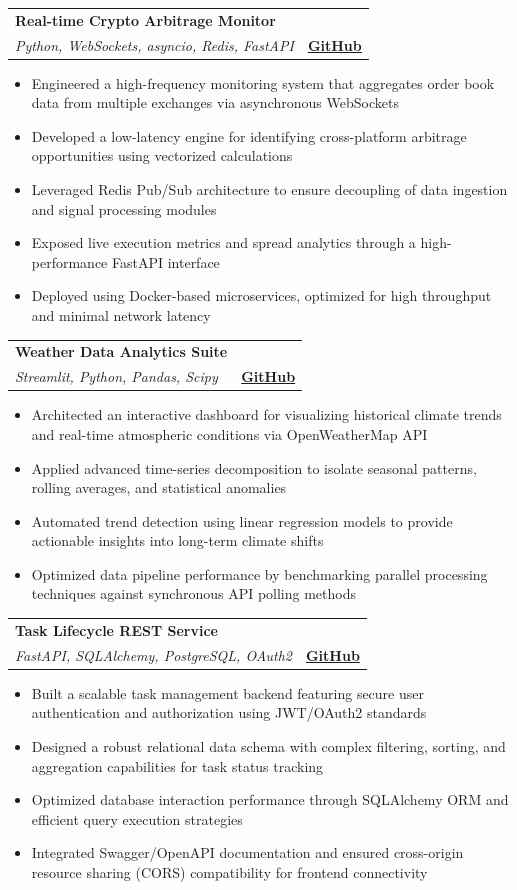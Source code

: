 \documentclass[a4paper,11pt]{article}
\makeatletter
\newcommand{\resumeProject}[4]{
\vspace{0.5mm}\item
    \begin{tabular*}{0.98\textwidth}[t]{l@{\extracolsep{\fill}}r}
        \textbf{#1} & \textit{\footnotesize{#3}} \\
        \footnotesize{\textit{#2}} & \footnotesize{#4}
    \end{tabular*}
    \vspace{-2.4mm}
}
\newcommand{\resumeItemListStart}{\begin{justify}\begin{itemize}[leftmargin=3ex, rightmargin=2ex, noitemsep,labelsep=1.2mm,itemsep=0mm]\small}
\newcommand{\resumeItemListEnd}{\end{itemize}\end{justify}\vspace{-2mm}}
\makeatother
\begin{document}
    \resumeProject
      {Real-time Crypto Arbitrage Monitor} %
      {Python, WebSockets, asyncio, Redis, FastAPI} %
      {} %
      {\href{https://github.com}{\textbf{GitHub}}} %
      \resumeItemListStart
        \item {Engineered a high-frequency monitoring system that aggregates order book data from multiple exchanges via asynchronous WebSockets}
        \item {Developed a low-latency engine for identifying cross-platform arbitrage opportunities using vectorized calculations}
        \item {Leveraged Redis Pub/Sub architecture to ensure decoupling of data ingestion and signal processing modules}
        \item {Exposed live execution metrics and spread analytics through a high-performance FastAPI interface}
        \item {Deployed using Docker-based microservices, optimized for high throughput and minimal network latency}
      \resumeItemListEnd
    
    \resumeProject
      {Weather Data Analytics Suite} %
      {Streamlit, Python, Pandas, Scipy} %
      {} %
      {\href{https://github.com}{\textbf{GitHub}}} %
      \resumeItemListStart
        \item {Architected an interactive dashboard for visualizing historical climate trends and real-time atmospheric conditions via OpenWeatherMap API}
        \item {Applied advanced time-series decomposition to isolate seasonal patterns, rolling averages, and statistical anomalies}
        \item {Automated trend detection using linear regression models to provide actionable insights into long-term climate shifts}
        \item {Optimized data pipeline performance by benchmarking parallel processing techniques against synchronous API polling methods}
      \resumeItemListEnd
    
     \vspace{-1mm}
     
    \resumeProject
      {Task Lifecycle REST Service} %
      {FastAPI, SQLAlchemy, PostgreSQL, OAuth2} %
      {} %
      {\href{https://github.com}{\textbf{GitHub}}} %
      \resumeItemListStart
        \item {Built a scalable task management backend featuring secure user authentication and authorization using JWT/OAuth2 standards}
        \item {Designed a robust relational data schema with complex filtering, sorting, and aggregation capabilities for task status tracking}
        \item {Optimized database interaction performance through SQLAlchemy ORM and efficient query execution strategies}
        \item {Integrated Swagger/OpenAPI documentation and ensured cross-origin resource sharing (CORS) compatibility for frontend connectivity}
      \resumeItemListEnd
\end{document}
